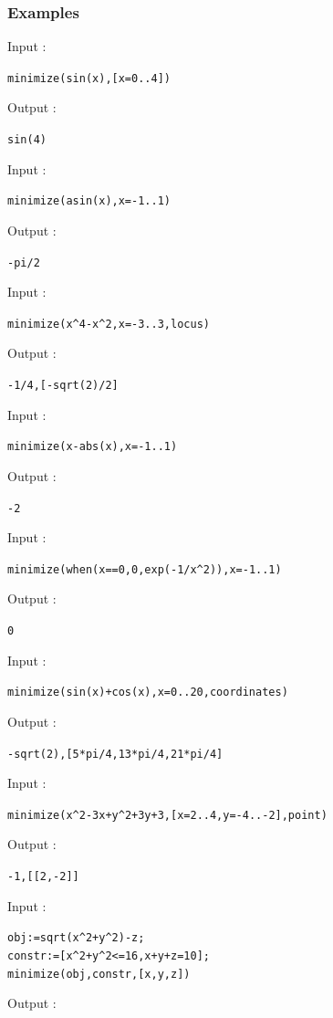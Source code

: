 \documentclass[a4paper,11pt]{book}
\begin{document}
\subsubsection{Examples}
Input :
\begin{center}
{\tt minimize(sin(x),[x=0..4])}
\end{center}
Output :
\begin{center}
{\tt sin(4)}
\end{center}
Input :
\begin{center}
{\tt minimize(asin(x),x=-1..1)}
\end{center}
Output :
\begin{center}
{\tt -pi/2}
\end{center}
Input :
\begin{center}
{\tt minimize(x\verb|^|4-x\verb|^|2,x=-3..3,locus)}
\end{center}
Output :
\begin{center}
{\tt -1/4,[-sqrt(2)/2]}
\end{center}
Input :
\begin{center}
{\tt minimize(x-abs(x),x=-1..1)}
\end{center}
Output :
\begin{center}
{\tt -2}
\end{center}
Input :
\begin{center}
{\tt minimize(when(x==0,0,exp(-1/x\verb|^|2)),x=-1..1)}
\end{center}
Output :
\begin{center}
{\tt 0}
\end{center}
Input :
\begin{center}
{\tt minimize(sin(x)+cos(x),x=0..20,coordinates)}
\end{center}
Output :
\begin{center}
{\tt -sqrt(2),[5*pi/4,13*pi/4,21*pi/4]}
\end{center}
Input :
\begin{center}
{\tt minimize(x\verb|^|2-3x+y\verb|^|2+3y+3,[x=2..4,y=-4..-2],point)}
\end{center}
Output :
\begin{center}
{\tt -1,[[2,-2]]}
\end{center}
Input :
\begin{center}
{\tt obj:=sqrt(x\verb|^|2+y\verb|^|2)-z;}\\
{\tt constr:=[x\verb|^|2+y\verb|^|2<=16,x+y+z=10];}\\
{\tt minimize(obj,constr,[x,y,z])}
\end{center}
Output :
\end{document}
